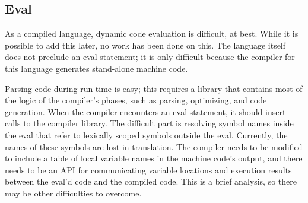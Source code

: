 \subsection{Eval}

As a compiled language, dynamic code evaluation is difficult, at best.  While it is possible to add this later, no work
has been done on this.  The language itself does not preclude an eval statement; it is only difficult because the
compiler for this language generates stand-alone machine code.

Parsing code during run-time is easy; this requires a library that contains most of the logic of the compiler's phases,
such as parsing, optimizing, and code generation.  When the compiler encounters an eval statement, it should insert calls
to the compiler library.  The difficult part is resolving symbol names inside the eval that refer to lexically scoped
symbols outside the eval.  Currently, the names of these symbols are lost in translation.  The compiler needs to be
modified to include a table of local variable names in the machine code's output, and there needs to be an API for
communicating variable locations and execution results between the eval'd code and the compiled code.  This is a brief
analysis, so there may be other difficulties to overcome.
